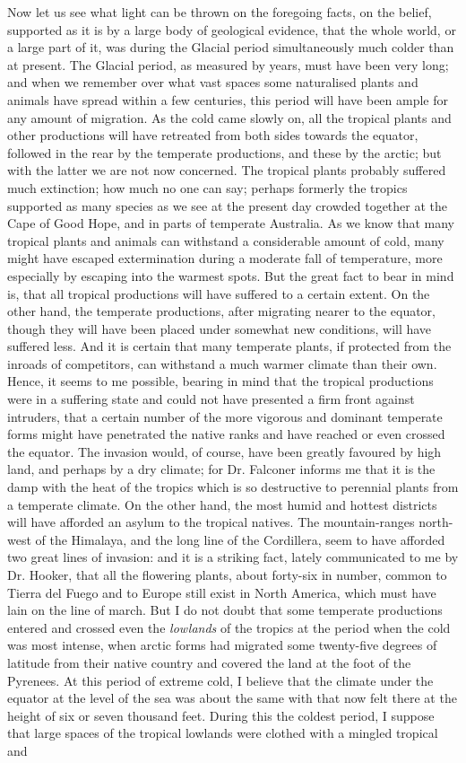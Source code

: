 \indent Now let us see what light can be thrown on the foregoing facts, on the belief, supported as it is by a large body of geological evidence, that the whole world, or a large part of it, was during the Glacial period simultaneously much colder than at present. The Glacial period, as measured by years, must have been very long; and when we remember over what vast spaces some naturalised plants and animals have spread within a few centuries, this period will have been ample for any amount of migration. As the cold came slowly on, all the tropical plants and other productions will have retreated from both sides towards the equator, followed in the rear by the temperate productions, and these by the arctic; but with the latter we are not now concerned. The tropical plants probably suffered much extinction; how much no one can say; perhaps formerly the tropics supported as many species as we see at the present day crowded together at the Cape of Good Hope, and in parts of temperate Australia. As we know that many tropical plants and animals can withstand a considerable amount of cold, many might have escaped extermination during a moderate fall of temperature, more especially by escaping into the warmest spots. But the great fact to bear in mind is, that all tropical productions will have suffered to a certain extent. On the other hand, the temperate productions, after migrating nearer to the equator, though they will have been placed under somewhat new conditions, will have suffered less. And it is certain that many temperate plants, if protected from the inroads of competitors, can withstand a much warmer climate than their own. Hence, it seems to me possible, bearing in mind that the tropical productions were in a suffering state and could not have presented a firm front against intruders, that a certain number of the more vigorous and dominant temperate forms might have penetrated the native ranks and have reached or even crossed the equator. The invasion would, of course, have been greatly favoured by high land, and perhaps by a dry climate; for Dr. Falconer informs me that it is the damp with the heat of the tropics which is so destructive to perennial plants from a temperate climate. On the other hand, the most humid and hottest districts will have afforded an asylum to the tropical natives. The mountain-ranges north-west of the Himalaya, and the long line of the Cordillera, seem to have afforded two great lines of invasion: and it is a striking fact, lately communicated to me by Dr. Hooker, that all the flowering plants, about forty-six in number, common to Tierra del Fuego and to Europe still exist in North America, which must have lain on the line of march. But I do not doubt that some temperate productions entered and crossed even the \emph{lowlands} of the tropics at the period when the cold was most intense, when arctic forms had migrated some twenty-five degrees of latitude from their native country and covered the land at the foot of the Pyrenees. At this period of extreme cold, I believe that the climate under the equator at the level of the sea was about the same with that now felt there at the height of six or seven thousand feet. During this the coldest period, I suppose that large spaces of the tropical lowlands were clothed with a mingled tropical and 